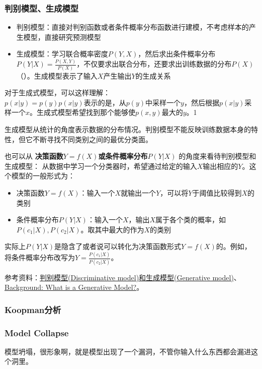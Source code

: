 \subsubsection{判别模型、生成模型}
\begin{itemize}
	\item 判别模型：直接对判别函数或者条件概率分布函数进行建模，不考虑样本的产生模型，直接研究预测模型
	\item 生成模型：学习联合概率密度$P(Y, X)$，然后求出条件概率分布$P(Y|X) = \frac{P(X, Y)}{P(X)}$，不仅要求出联合分布，还要求出训练数据的分布$P(X)$（{\color{red}{不一定要计算$p(X)$，因为对于同一个样本，计算它属于不同分类时，其$p(X)$是一样的，对判别没有帮助}}）。生成模型表示了输入$X$产生输出$Y$的生成关系
\end{itemize}

对于生成式模型，可以这样理解：\\
$p(x | y) = p(y)p(x | y)$表示的是，从$p(y)$中采样一个$y$，然后根据$p(x|y)$采样一个$x$。生成式模型希望找到那个能够使$p(x, y)$最大的$y$。1


生成模型从统计的角度表示数据的分布情况。判别模型不能反映训练数据本身的特性，但它不断寻找不同类别之间的最优分类面。

也可以从 \textbf{决策函数$Y=f(X)$或条件概率分布$P(Y|X)$} 的角度来看待判别模型和生成模型：
从数据中学习一个分类器时，希望通过给定的输入$X$输出相应的$Y$。这个模型的一般形式为：
\begin{itemize}
	\item 决策函数$Y=f(X)$：输入一个$X$就输出一个$Y$，可以将$Y$于阈值比较得到$X$的类别
	\item 条件概率分布$P(Y|X)$：输入一个$X$，输出$X$属于各个类的概率，如$P(c_1 | X), P(c_2 | X)$。取其中最大的作为$X$的类别
\end{itemize}
实际上$P(Y|X)$是隐含了或者说可以转化为决策函数形式$Y=f(X)$的。例如，将条件概率分布改写为$Y = \frac{P(c_1 | X)}{P(c_2 | X) }$。

参考资料：\href{https://blog.csdn.net/fishmemory/article/details/51711114}{判别模型(Discriminative model)和生成模型(Generative model)}、\href{https://developers.google.cn/machine-learning/gan/generative?hl=zh-cn}{Background: What is a Generative Model?}。


\subsubsection{Koopman分析}


\subsubsection{Model Collapse}
模型坍塌，很形象啊，就是模型出现了一个漏洞，不管你输入什么东西都会漏进这个洞里。


